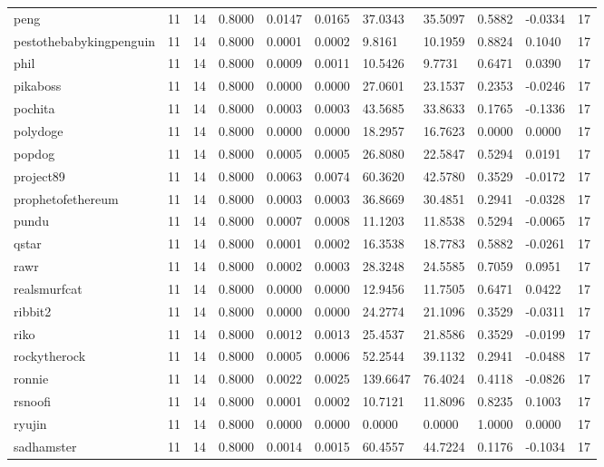 \begin{table}[htbp]
\begin{tabular}{lllllllllll}
peng & 11 & 14 & 0.8000 & 0.0147 & 0.0165 & 37.0343 & 35.5097 & 0.5882 & -0.0334 & 17 \\
pestothebabykingpenguin & 11 & 14 & 0.8000 & 0.0001 & 0.0002 & 9.8161 & 10.1959 & 0.8824 & 0.1040 & 17 \\
phil & 11 & 14 & 0.8000 & 0.0009 & 0.0011 & 10.5426 & 9.7731 & 0.6471 & 0.0390 & 17 \\
pikaboss & 11 & 14 & 0.8000 & 0.0000 & 0.0000 & 27.0601 & 23.1537 & 0.2353 & -0.0246 & 17 \\
pochita & 11 & 14 & 0.8000 & 0.0003 & 0.0003 & 43.5685 & 33.8633 & 0.1765 & -0.1336 & 17 \\
polydoge & 11 & 14 & 0.8000 & 0.0000 & 0.0000 & 18.2957 & 16.7623 & 0.0000 & 0.0000 & 17 \\
popdog & 11 & 14 & 0.8000 & 0.0005 & 0.0005 & 26.8080 & 22.5847 & 0.5294 & 0.0191 & 17 \\
project89 & 11 & 14 & 0.8000 & 0.0063 & 0.0074 & 60.3620 & 42.5780 & 0.3529 & -0.0172 & 17 \\
prophetofethereum & 11 & 14 & 0.8000 & 0.0003 & 0.0003 & 36.8669 & 30.4851 & 0.2941 & -0.0328 & 17 \\
pundu & 11 & 14 & 0.8000 & 0.0007 & 0.0008 & 11.1203 & 11.8538 & 0.5294 & -0.0065 & 17 \\
qstar & 11 & 14 & 0.8000 & 0.0001 & 0.0002 & 16.3538 & 18.7783 & 0.5882 & -0.0261 & 17 \\
rawr & 11 & 14 & 0.8000 & 0.0002 & 0.0003 & 28.3248 & 24.5585 & 0.7059 & 0.0951 & 17 \\
realsmurfcat & 11 & 14 & 0.8000 & 0.0000 & 0.0000 & 12.9456 & 11.7505 & 0.6471 & 0.0422 & 17 \\
ribbit2 & 11 & 14 & 0.8000 & 0.0000 & 0.0000 & 24.2774 & 21.1096 & 0.3529 & -0.0311 & 17 \\
riko & 11 & 14 & 0.8000 & 0.0012 & 0.0013 & 25.4537 & 21.8586 & 0.3529 & -0.0199 & 17 \\
rockytherock & 11 & 14 & 0.8000 & 0.0005 & 0.0006 & 52.2544 & 39.1132 & 0.2941 & -0.0488 & 17 \\
ronnie & 11 & 14 & 0.8000 & 0.0022 & 0.0025 & 139.6647 & 76.4024 & 0.4118 & -0.0826 & 17 \\
rsnoofi & 11 & 14 & 0.8000 & 0.0001 & 0.0002 & 10.7121 & 11.8096 & 0.8235 & 0.1003 & 17 \\
ryujin & 11 & 14 & 0.8000 & 0.0000 & 0.0000 & 0.0000 & 0.0000 & 1.0000 & 0.0000 & 17 \\
sadhamster & 11 & 14 & 0.8000 & 0.0014 & 0.0015 & 60.4557 & 44.7224 & 0.1176 & -0.1034 & 17 \\

\end{tabular}
\end{table}
